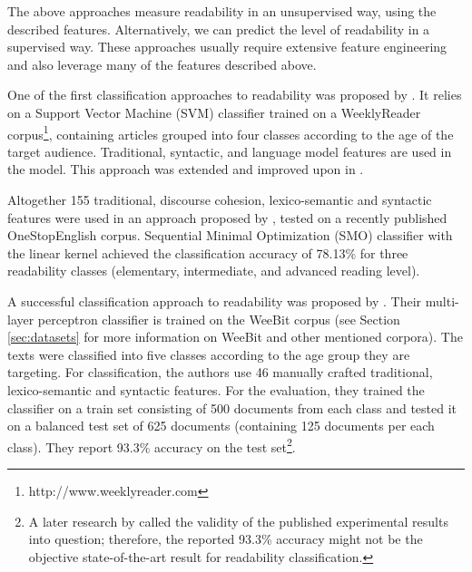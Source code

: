 \documentclass{clv3}
\begin{document}
The above approaches measure readability in an unsupervised way, using the described features. Alternatively, we can predict the level of readability in a supervised way. These approaches usually require extensive feature engineering and also leverage many of the features described above.

One of the first classification approaches to readability was proposed by \citet{schwarm2005reading}. It relies on a Support Vector Machine (SVM) classifier trained on a WeeklyReader corpus\footnote{http://www.weeklyreader.com}, containing articles grouped into four classes according to the age of the target audience. Traditional, syntactic, and language model features are used in the model. This approach was extended and improved upon in \citet{petersen2009machine}. 

Altogether 155 traditional, discourse cohesion, lexico-semantic and syntactic features were used in an approach proposed by \citet{vajjala2018onestopenglish}, tested on a recently published OneStopEnglish corpus. Sequential Minimal Optimization (SMO) classifier with the linear kernel achieved the classification accuracy of 78.13\% for three readability classes (elementary, intermediate, and advanced reading level). 

A successful classification approach to readability was proposed by \citet{vajjala2012improving}. Their multi-layer perceptron classifier is trained on the WeeBit corpus \citep{vajjala2012improving} (see Section \ref{sec:datasets} for more information on WeeBit and other mentioned corpora). The texts were classified into five classes according to the age group they are targeting. For classification, the authors use 46 manually crafted traditional, lexico-semantic and syntactic features. For the evaluation, they trained the classifier on a train set consisting of 500 documents from each class and tested it on a balanced test set of 625 documents (containing 125 documents per each class). They report 
93.3\% accuracy on the test set\footnote{A later research by \citet{xia2016text} called the validity of the published experimental results into question; therefore, the reported 93.3\% accuracy might not be the objective state-of-the-art result for readability classification.}. 
\end{document}
